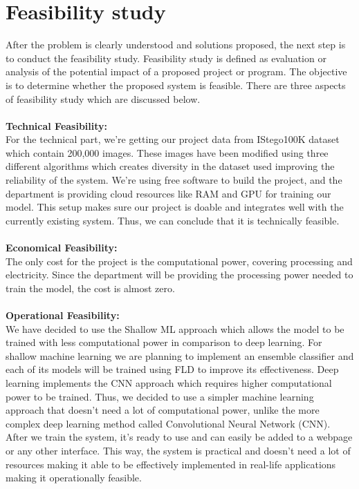 \chapter{Feasibility study} \sloppy
After the problem is clearly understood and solutions proposed, the next step is to conduct the
feasibility study. Feasibility study is defined as evaluation or analysis of the potential impact
of a proposed project or program. The objective is to determine whether the proposed system
is feasible. There are three aspects of feasibility study which are discussed below.\\ \\
\textbf{Technical Feasibility:}\\For the technical part, we're getting our project data from IStego100K dataset which contain 200,000 images. These images have been modified using three different algorithms which creates diversity in the dataset used improving the reliability of the system. We're using free software to build the project, and the department is providing cloud resources like RAM and GPU for training our model. This setup makes sure our project is doable and integrates well with the currently existing system. Thus, we can conclude that it is technically feasible.\\ \\
\textbf{Economical Feasibility:}\\The only cost for the project is the computational power, covering processing and electricity. Since the department will be providing the processing power needed to train the model, the cost is almost zero.\\ \\
\textbf{Operational Feasibility:}\\We have decided to use the Shallow ML approach which allows the model to be trained with less computational power in comparison to deep learning. For shallow machine learning we are planning to implement an ensemble classifier and each of its models will be trained using FLD to improve its effectiveness. Deep learning implements the CNN approach which requires higher computational power to be trained. Thus, we decided to use a simpler machine learning approach that doesn't need a lot of computational power, unlike the more complex deep learning method called Convolutional Neural Network (CNN). After we train the system, it's ready to use and can easily be added to a webpage or any other interface. This way, the system is practical and doesn't need a lot of resources making it able to be effectively implemented in real-life applications making it operationally feasible.
\\